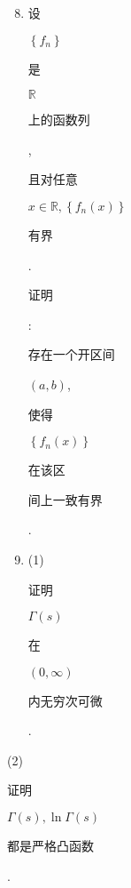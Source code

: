 \documentclass[10pt]{article}
\begin{document}
\begin{enumerate}
  \setcounter{enumi}{7}
  \item \begin{CJK}{UTF8}{mj}设\end{CJK} $\left\{f_{n}\right\}$ \begin{CJK}{UTF8}{mj}是\end{CJK} $\mathbb{R}$ \begin{CJK}{UTF8}{mj}上的函数列\end{CJK}, \begin{CJK}{UTF8}{mj}且对任意\end{CJK} $x \in \mathbb{R},\left\{f_{n}(x)\right\}$ \begin{CJK}{UTF8}{mj}有界\end{CJK}. \begin{CJK}{UTF8}{mj}证明\end{CJK}: \begin{CJK}{UTF8}{mj}存在一个开区间\end{CJK} $(a, b)$, \begin{CJK}{UTF8}{mj}使得\end{CJK} $\left\{f_{n}(x)\right\}$ \begin{CJK}{UTF8}{mj}在该区\end{CJK} \begin{CJK}{UTF8}{mj}间上一致有界\end{CJK}.

  \item (1) \begin{CJK}{UTF8}{mj}证明\end{CJK} $\Gamma(s)$ \begin{CJK}{UTF8}{mj}在\end{CJK} $(0, \infty)$ \begin{CJK}{UTF8}{mj}内无穷次可微\end{CJK}.

\end{enumerate}
(2) \begin{CJK}{UTF8}{mj}证明\end{CJK} $\Gamma(s), \ln \Gamma(s)$ \begin{CJK}{UTF8}{mj}都是严格凸函数\end{CJK}.
\end{document}
